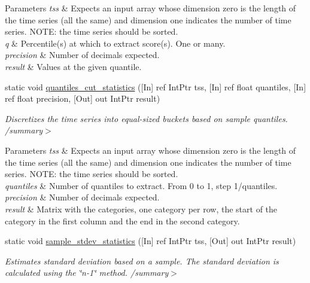 \begin{DoxyCompactItemize}
\begin{DoxyCompactList}
\begin{DoxyParams}{Parameters}
{\em tss} & Expects an input array whose dimension zero is the length of the time series (all the same) and dimension one indicates the number of time series. N\+O\+TE\+: the time series should be sorted.\\
\hline
{\em q} & Percentile(s) at which to extract score(s). One or many.\\
\hline
{\em precision} & Number of decimals expected.\\
\hline
{\em result} & Values at the given quantile.\\
\hline
\end{DoxyParams}
\end{DoxyCompactList}\item 
static void \mbox{\hyperlink{classkhiva_1_1interop_1_1_d_l_l_statistics_a7ac2cfeecfff5f705d848bfed8adf33b}{quantiles\+\_\+cut\+\_\+statistics}} (\mbox{[}In\mbox{]} ref Int\+Ptr tss, \mbox{[}In\mbox{]} ref float quantiles, \mbox{[}In\mbox{]} ref float precision, \mbox{[}Out\mbox{]} out Int\+Ptr result)
\begin{DoxyCompactList}\small\item\em Discretizes the time series into equal-\/sized buckets based on sample quantiles. /summary$>$ 
\begin{DoxyParams}{Parameters}
{\em tss} & Expects an input array whose dimension zero is the length of the time series (all the same) and dimension one indicates the number of time series. N\+O\+TE\+: the time series should be sorted.\\
\hline
{\em quantiles} & Number of quantiles to extract. From 0 to 1, step 1/quantiles.\\
\hline
{\em precision} & Number of decimals expected.\\
\hline
{\em result} & Matrix with the categories, one category per row, the start of the category in the first column and the end in the second category.\\
\hline
\end{DoxyParams}
\end{DoxyCompactList}\item 
static void \mbox{\hyperlink{classkhiva_1_1interop_1_1_d_l_l_statistics_adb2cd392d8195616874042120458a1bf}{sample\+\_\+stdev\+\_\+statistics}} (\mbox{[}In\mbox{]} ref Int\+Ptr tss, \mbox{[}Out\mbox{]} out Int\+Ptr result)
\begin{DoxyCompactList}\small\item\em Estimates standard deviation based on a sample. The standard deviation is calculated using the \char`\"{}n-\/1\char`\"{} method. /summary$>$ 

\end{DoxyCompactList}
\end{DoxyCompactItemize}
